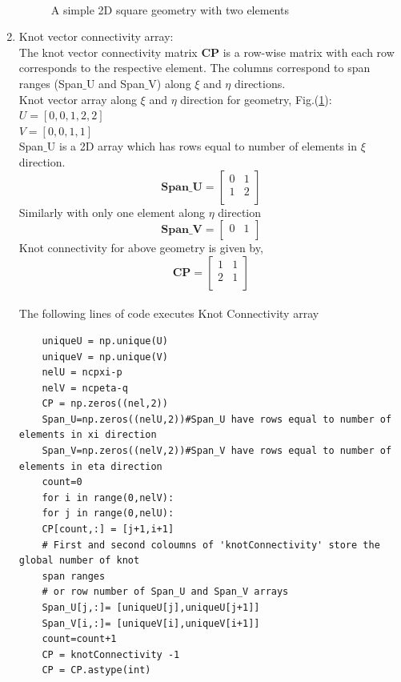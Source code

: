 \documentclass[11pt]{article}
\begin{document}
\begin{enumerate}[leftmargin=*]
\begin{figure}[H]
\begin{center}
			\caption{\\A simple 2D square geometry with two elements}\label{Element}
		\end{center}	
	\end{figure}
	\item Knot vector connectivity array: \\
	The knot vector connectivity matrix \textbf{CP} is a row-wise matrix with each row corresponds to the respective element. The columns correspond to span ranges (Span$\_$U and Span$\_$V) along $\xi$ and $\eta$ directions. \\
	Knot vector array along $\xi$ and $\eta$ direction for geometry, Fig.(\ref{Element}): \\
	$U = [ 0, 0, 1, 2, 2 ]$ \\
	$V = [ 0, 0, 1, 1 ]$ \\
	Span$\_$U is a 2D array which has rows equal to number of elements in $\xi$ direction.
	\begin{equation} \label{SpanU}
	\textbf{Span\_U} =
	\begin{bmatrix}
	0 & 1  \\
	1 & 2  \\
	\end{bmatrix}
	\end{equation}
	Similarly with only one element along $\eta$ direction
	\begin{equation} \label{SpanU}
	\textbf{Span\_V} =
	\begin{bmatrix}
	0 & 1  \\
	\end{bmatrix}
	\end{equation}
	Knot connectivity for above geometry is given by,
	\begin{equation} \label{CP}
	\textbf{CP} =
	\begin{bmatrix}
	1 & 1  \\
	2 & 1  \\
	\end{bmatrix}
	\end{equation}
\\
	The following lines of code executes Knot Connectivity array
	\begin{verbatim}
	uniqueU = np.unique(U)
	uniqueV = np.unique(V)
	nelU = ncpxi-p
	nelV = ncpeta-q
	CP = np.zeros((nel,2)) 
	Span_U=np.zeros((nelU,2))#Span_U have rows equal to number of elements in xi direction
	Span_V=np.zeros((nelV,2))#Span_V have rows equal to number of elements in eta direction
	count=0
	for i in range(0,nelV):
	for j in range(0,nelU):
	CP[count,:] = [j+1,i+1] 
	# First and second coloumns of 'knotConnectivity' store the global number of knot 
	span ranges
	# or row number of Span_U and Span_V arrays
	Span_U[j,:]= [uniqueU[j],uniqueU[j+1]]
	Span_V[i,:]= [uniqueV[i],uniqueV[i+1]]
	count=count+1
	CP = knotConnectivity -1
	CP = CP.astype(int)
	\end{verbatim} 
	
	
	\begin{verbatim}

	\end{verbatim}
\end{enumerate}
\end{document}
